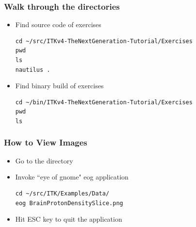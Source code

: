 {
\begin{frame}[fragile]
\frametitle{Walk through the directories}
\begin{itemize}
\item Find source code of exercises
\begin{verbatim}
cd ~/src/ITKv4-TheNextGeneration-Tutorial/Exercises
pwd
ls
nautilus .
\end{verbatim}
\pause
\item Find binary build of exercises
\begin{verbatim}
cd ~/bin/ITKv4-TheNextGeneration-Tutorial/Exercises
pwd
ls
\end{verbatim}
\end{itemize}
\end{frame}
}

{
\begin{frame}[fragile]
\frametitle{How to View Images}
\begin{itemize}
\item Go to the directory
\item Invoke ``eye of gnome" eog application
\begin{verbatim}
cd ~/src/ITK/Examples/Data/
eog BrainProtonDensitySlice.png
\end{verbatim}
\pause
\item Hit ESC key to quit the application
\end{itemize}
\end{frame}
}
